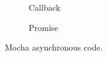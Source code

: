 
\begin{figure}[H]
	\newcommand{\basicstyle}{\scriptsize}
	\begin{subfigure}[b]{0.45\textwidth}
        
        \caption{Callback}
        \label{fig:mocha_callback}
    \end{subfigure}
    \begin{subfigure}[b]{0.5\textwidth}
		
        \caption{Promise}
        \label{fig:mocha_promise}
    \end{subfigure}
	\caption[Mocha asynchronous code]{Mocha asynchronous code.}
	\label{fig:mocha_asynchronous_code}
\end{figure}
